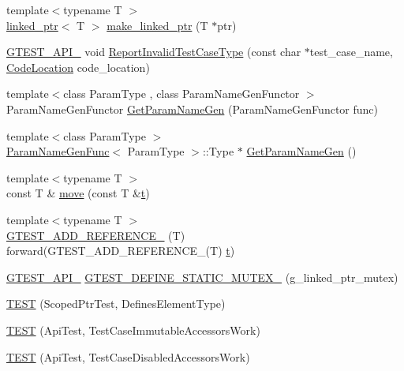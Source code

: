 \begin{DoxyCompactItemize}
\item 
{\footnotesize template$<$typename T $>$ }\\\mbox{\hyperlink{classtesting_1_1internal_1_1linked__ptr}{linked\+\_\+ptr}}$<$ T $>$ \mbox{\hyperlink{namespacetesting_1_1internal_a0d79fad1f772844eff35dfe955f24fd6}{make\+\_\+linked\+\_\+ptr}} (T $\ast$ptr)
\item 
\mbox{\hyperlink{_obj__test_2lib_2googletest-release-1_88_81_2googletest_2include_2gtest_2internal_2gtest-port_8h_aa73be6f0ba4a7456180a94904ce17790}{G\+T\+E\+S\+T\+\_\+\+A\+P\+I\+\_\+}} void \mbox{\hyperlink{namespacetesting_1_1internal_ab7e343160ee0aca7c8ae7c025a372453}{Report\+Invalid\+Test\+Case\+Type}} (const char $\ast$test\+\_\+case\+\_\+name, \mbox{\hyperlink{structtesting_1_1internal_1_1_code_location}{Code\+Location}} code\+\_\+location)
\item 
{\footnotesize template$<$class Param\+Type , class Param\+Name\+Gen\+Functor $>$ }\\Param\+Name\+Gen\+Functor \mbox{\hyperlink{namespacetesting_1_1internal_abc0f0626877188afba6ad122d502f088}{Get\+Param\+Name\+Gen}} (Param\+Name\+Gen\+Functor func)
\item 
{\footnotesize template$<$class Param\+Type $>$ }\\\mbox{\hyperlink{structtesting_1_1internal_1_1_param_name_gen_func}{Param\+Name\+Gen\+Func}}$<$ Param\+Type $>$\+::Type $\ast$ \mbox{\hyperlink{namespacetesting_1_1internal_a27d6ea7d401e877cb0fbddf4206ebbe4}{Get\+Param\+Name\+Gen}} ()
\item 
{\footnotesize template$<$typename T $>$ }\\const T \& \mbox{\hyperlink{namespacetesting_1_1internal_a0f6d06bf8c3093b9c22bb08723db201e}{move}} (const T \&\mbox{\hyperlink{_mutual_8h_a978d88b393c8a37dc2614c88788b3442}{t}})
\item 
{\footnotesize template$<$typename T $>$ }\\\mbox{\hyperlink{namespacetesting_1_1internal_a3b78178c942d020bb164d80d8c778bff}{G\+T\+E\+S\+T\+\_\+\+A\+D\+D\+\_\+\+R\+E\+F\+E\+R\+E\+N\+C\+E\+\_\+}} (T) forward(G\+T\+E\+S\+T\+\_\+\+A\+D\+D\+\_\+\+R\+E\+F\+E\+R\+E\+N\+C\+E\+\_\+(T) \mbox{\hyperlink{_mutual_8h_a978d88b393c8a37dc2614c88788b3442}{t}})
\item 
\mbox{\hyperlink{_obj__test_2lib_2googletest-release-1_88_81_2googletest_2include_2gtest_2internal_2gtest-port_8h_aa73be6f0ba4a7456180a94904ce17790}{G\+T\+E\+S\+T\+\_\+\+A\+P\+I\+\_\+}} \mbox{\hyperlink{namespacetesting_1_1internal_aff419d76acc3727be48d195f927189c9}{G\+T\+E\+S\+T\+\_\+\+D\+E\+F\+I\+N\+E\+\_\+\+S\+T\+A\+T\+I\+C\+\_\+\+M\+U\+T\+E\+X\+\_\+}} (g\+\_\+linked\+\_\+ptr\+\_\+mutex)
\item 
\mbox{\hyperlink{namespacetesting_1_1internal_a99f56e2e9d5b30a879f877cc72bb0c0c}{T\+E\+ST}} (Scoped\+Ptr\+Test, Defines\+Element\+Type)
\item 
\mbox{\hyperlink{namespacetesting_1_1internal_a33809333fe5b5f33c2bd56ddcdd1dbb6}{T\+E\+ST}} (Api\+Test, Test\+Case\+Immutable\+Accessors\+Work)
\item 
\mbox{\hyperlink{namespacetesting_1_1internal_a459d693357db8f8f48c26a8bee3ffb84}{T\+E\+ST}} (Api\+Test, Test\+Case\+Disabled\+Accessors\+Work)
\end{DoxyCompactItemize}

